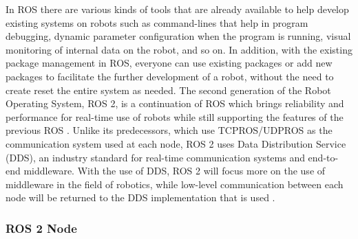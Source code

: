 In ROS there are various kinds of tools that are already available to help develop existing systems on robots such as command-lines that help in program debugging, dynamic parameter configuration when the program is running, visual monitoring of internal data on the robot, and so on. In addition, with the existing package management in ROS, everyone can use existing packages or add new packages to facilitate the further development of a robot, without the need to create
reset the entire system as needed. The second generation of the Robot Operating System, ROS 2, is a continuation of ROS which brings reliability and performance for real-time use of robots while still supporting the features of the previous ROS \parencite{Maruyama}. Unlike its predecessors, which use TCPROS/UDPROS as the communication system used at each node, ROS 2 uses Data Distribution Service (DDS), an industry standard for real-time communication systems and end-to-end middleware. 
With the use of DDS, ROS 2 will focus more on the use of middleware in the field of robotics, while low-level communication between each node will be returned to the DDS implementation that is used \parencite{fikri2021}.

\subsubsection{ROS 2 Node}
\label{subsubsec:ros2node}


